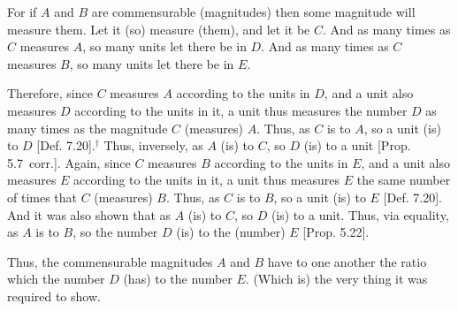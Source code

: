 \begin{Parallel}{}{}
{For if $A$ and $B$ are commensurable (magnitudes) then some magnitude
will measure them. Let it (so) measure (them), and let it be $C$. And
as many times as $C$ measures $A$, so many units let there be in
$D$. And as many times as $C$ measures $B$, so many units let there be
in $E$.

Therefore, since $C$ measures $A$ according to the units in $D$, and
a unit also measures $D$ according to the units in it,  a unit thus measures the
number $D$ as many times as the magnitude $C$ (measures) $A$. 
Thus, as $C$ is to $A$, so a unit (is) to $D$ [Def. 7.20].$^\dag$ Thus, inversely, as $A$ (is) to $C$, so
$D$ (is) to a unit [Prop. 5.7~corr.]. Again, since
$C$ measures $B$ according to the units in $E$, and a unit also measures $E$ according to the units in it,   a unit thus measures $E$ the
same number of times that $C$ (measures) $B$. Thus, as $C$ is to $B$, so
a unit (is) to $E$ [Def. 7.20]. And it was also
shown that as $A$ (is) to $C$, so $D$ (is) to a unit. Thus, via equality,
as $A$ is to $B$, so the number $D$ (is) to the (number) $E$ [Prop. 5.22].

Thus, the commensurable magnitudes $A$ and $B$ have to one another
the ratio which the number $D$ (has) to the number $E$. (Which is) the
very thing it was required to show.}
\end{Parallel}


\vspace{7pt}{\footnotesize\noindent$^\dag$ There is a slight logical gap here, since Def.~7.20  applies to four numbers, rather than two number and two magnitudes.}

